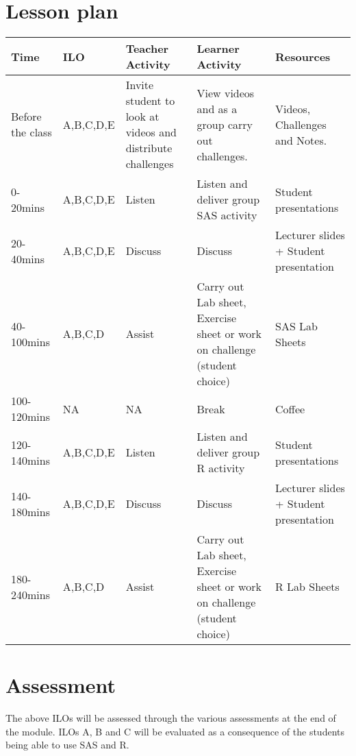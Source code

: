 \documentclass[12pt]{article}
\begin{document}
\section{Lesson plan}
\begin{center}
\begin{tabular}{|p{2cm}|p{2cm}|p{4.5cm}|p{4.5cm}|p{2cm}|}
\hline
Time&ILO&Teacher Activity& Learner Activity& Resources\\\hline
Before the class&A,B,C,D,E&Invite student to look at videos and distribute challenges&View videos and as a group carry out challenges.&Videos, Challenges and Notes.\\\hline
0-20mins&A,B,C,D,E&Listen&Listen and deliver group SAS activity&Student presentations\\\hline
20-40mins&A,B,C,D,E&Discuss&Discuss&Lecturer slides + Student presentation\\\hline
40-100mins&A,B,C,D&Assist&Carry out Lab sheet, Exercise sheet or work on challenge (student choice) &SAS Lab Sheets\\\hline
100-120mins&NA&NA&Break&Coffee\\\hline
120-140mins&A,B,C,D,E&Listen&Listen and deliver group R activity&Student presentations\\\hline
140-180mins&A,B,C,D,E&Discuss&Discuss&Lecturer slides + Student presentation\\\hline
180-240mins&A,B,C,D&Assist&Carry out Lab sheet, Exercise sheet or work on challenge (student choice) &R Lab Sheets\\\hline
\end{tabular}
\end{center}

\section{Assessment}
The above ILOs will be assessed through the various assessments at the end of the module. ILOs A, B and C will be evaluated as a consequence of the students being able to use SAS and R.
\end{document}
